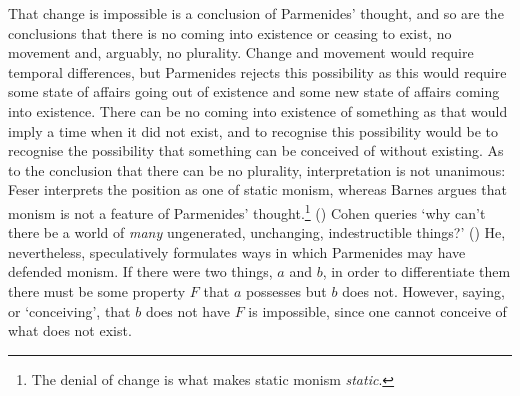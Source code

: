 That change is impossible is a conclusion of Parmenides' thought, and so are the conclusions that there is no coming into existence or ceasing to exist, no movement and, arguably, no plurality. Change and movement would require temporal differences, but Parmenides rejects this possibility as this would require some state of affairs going out of existence and some new state of affairs coming into existence. There can be no coming into existence of something as that would imply a time when it did not exist, and to recognise this possibility would be to recognise the possibility that something can be conceived of without existing. As to the conclusion that there can be no plurality, interpretation is not unanimous: Feser interprets the position as one of static monism, whereas Barnes argues that monism is not a feature of Parmenides' thought.\footnote{The denial of change is what makes static monism \emph{static}.} (\citeyear[][163-64]{barnes2002presocratic}) Cohen queries `why can't there be a world of \emph{many} ungenerated, unchanging, indestructible things?' (\citeyear[][]{cohen-parm1}) He, nevertheless, speculatively formulates ways in which Parmenides may have defended monism. If there were two things, $a$ and $b$, in order to differentiate them there must be some property $F$ that $a$ possesses but $b$ does not. However, saying, or `conceiving', that $b$ does not have $F$ is impossible, since one cannot conceive of what does not exist.

